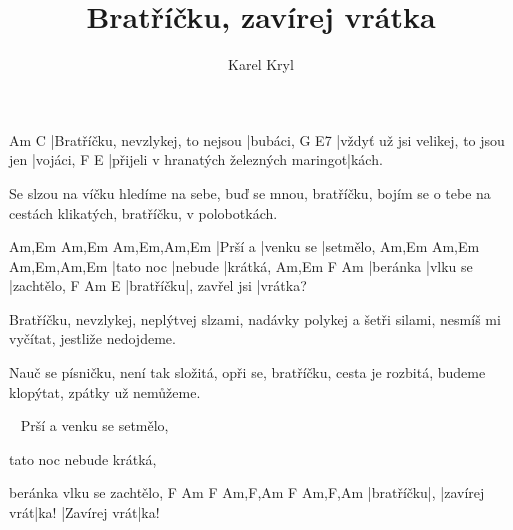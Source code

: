 \documentclass{song}
\title{Bratříčku, zavírej vrátka}
\author{Karel Kryl}
\begin{document}
\strophe
Am                               C
|Bratříčku, nevzlykej, to nejsou |bubáci,
G                                  E7
|vždyť už jsi velikej, to jsou jen |vojáci,
F                                      E
|přijeli v hranatých železných maringot|kách.
\endstrophe

\strophe*
Se slzou na víčku hledíme na sebe,
buď se mnou, bratříčku, bojím se o tebe
na cestách klikatých, bratříčku, v polobotkách.
\endstrophe

Am,Em   Am,Em     Am,Em,Am,Em
|Prší a |venku se |setmělo,
Am,Em     Am,Em   Am,Em,Am,Em
|tato noc |nebude |krátká,
Am,Em    F        Am
|beránka |vlku se |zachtělo,
F         Am            E
|bratříčku|, zavřel jsi |vrátka?
\endstrophe

\strophe*
Bratříčku, nevzlykej, neplýtvej slzami,
nadávky polykej a šetři silami,
nesmíš mi vyčítat, jestliže nedojdeme.
\endstrophe

\strophe*
Nauč se písničku, není tak složitá,
opři se, bratříčku, cesta je rozbitá,
budeme klopýtat, zpátky už nemůžeme.
\endstrophe

~
Prší a venku se setmělo,

tato noc nebude krátká,

beránka vlku se zachtělo,
F         Am F            Am,F,Am F            Am,F,Am
|bratříčku|, |zavírej vrát|ka!    |Zavírej vrát|ka!
\endstrophe
\end{document}
